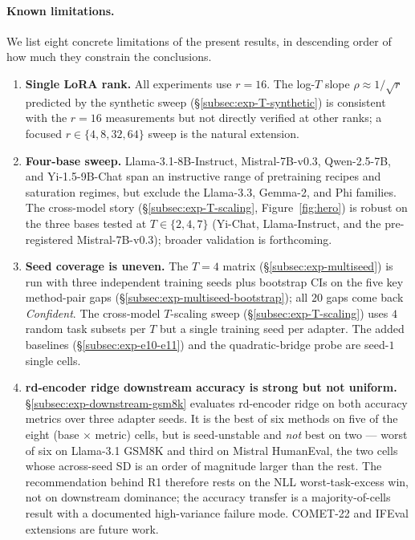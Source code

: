 \paragraph{Known limitations.}
We list eight concrete limitations of the present results, in
descending order of how much they constrain the conclusions.
\begin{enumerate}[leftmargin=*,topsep=2pt,itemsep=2pt]
\item \textbf{Single LoRA rank.} All experiments use $r = 16$. The
log-$T$ slope $\rho \approx 1/\sqrt{r}$ predicted by the synthetic
sweep (\S\ref{subsec:exp-T-synthetic}) is consistent with the $r = 16$
measurements but not directly verified at other ranks; a focused
$r \in \{4, 8, 32, 64\}$ sweep is the natural extension.

\item \textbf{Four-base sweep.} Llama-3.1-8B-Instruct,
Mistral-7B-v0.3, Qwen-2.5-7B, and Yi-1.5-9B-Chat span an instructive
range of pretraining recipes and saturation regimes, but exclude the
Llama-3.3, Gemma-2, and Phi families. The cross-model story
(\S\ref{subsec:exp-T-scaling}, Figure~\ref{fig:hero}) is robust on the
three bases tested at $T \in \{2, 4, 7\}$ (Yi-Chat, Llama-Instruct, and
the pre-registered Mistral-7B-v0.3); broader validation is
forthcoming.

\item \textbf{Seed coverage is uneven.} The $T = 4$ matrix
(\S\ref{subsec:exp-multiseed}) is run with three independent
training seeds plus bootstrap CIs on the five key method-pair gaps
(\S\ref{subsec:exp-multiseed-bootstrap}); all $20$ gaps come back
\emph{Confident}. The cross-model $T$-scaling sweep
(\S\ref{subsec:exp-T-scaling}) uses $4$ random task subsets per $T$
but a single training seed per adapter. The added baselines
(\S\ref{subsec:exp-e10-e11}) and the quadratic-bridge probe are
seed-$1$ single cells.

\item \textbf{rd-encoder ridge downstream accuracy is strong but not
uniform.} \S\ref{subsec:exp-downstream-gsm8k} evaluates rd-encoder
ridge on both accuracy metrics over three adapter seeds. It is the best
of six methods on five of the eight (base $\times$ metric) cells, but
is seed-unstable and \emph{not} best on two --- worst of six on
Llama-3.1 GSM8K and third on Mistral HumanEval, the two cells whose
across-seed SD is an order of magnitude larger than the rest. The
recommendation behind R1 therefore rests on the NLL worst-task-excess
win, not on downstream dominance; the accuracy transfer is a
majority-of-cells result with a documented high-variance failure mode.
COMET-22 and IFEval extensions are future work.


\end{enumerate}
